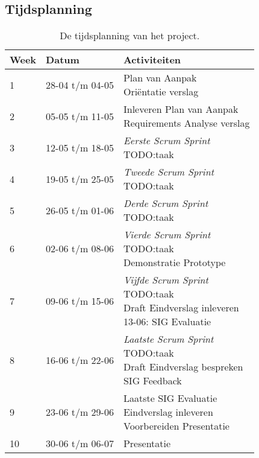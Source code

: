 \begin{appendices}
	\section{Tijdsplanning} \label{app:A}
	\begin{table}[!h]
	\def\arraystretch{1.5}
	\begin{tabularx}{\textwidth}{| p{1cm} | p{3cm}| X |}
	\hline
	\textbf{Week} & \textbf{Datum} & \textbf{Activiteiten} \\ \hline
	1 & 28-04 t/m 04-05 & \specialcell{Plan van Aanpak\\Ori\"entatie verslag}\\ \hline
	2 & 05-05 t/m 11-05 & \specialcell{Inleveren Plan van Aanpak\\Requirements Analyse verslag}\\ \hline
	3 & 12-05 t/m 18-05 & \specialcell{\textit{Eerste Scrum Sprint}\\TODO:taak}\\ \hline
	4 & 19-05 t/m 25-05 & \specialcell{\textit{Tweede Scrum Sprint}\\TODO:taak}\\ \hline
	5 & 26-05 t/m 01-06 & \specialcell{\textit{Derde Scrum Sprint}\\TODO:taak}\\ \hline
	6 & 02-06 t/m 08-06 & \specialcell{\textit{Vierde Scrum Sprint}\\TODO:taak\\Demonstratie Prototype}\\ \hline
	7 & 09-06 t/m 15-06 & \specialcell{\textit{Vijfde Scrum Sprint}\\TODO:taak\\Draft Eindverslag inleveren\\13-06: SIG Evaluatie}\\ \hline
	8 & 16-06 t/m 22-06 & \specialcell{\textit{Laatste Scrum Sprint}\\TODO:taak\\Draft Eindverslag bespreken\\SIG Feedback}\\ \hline
	9 & 23-06 t/m 29-06 & \specialcell{Laatste SIG Evaluatie\\Eindverslag inleveren\\Voorbereiden Presentatie}\\ \hline
	10 & 30-06 t/m 06-07 & Presentatie\\ \hline
	\end{tabularx}
	\caption{De tijdsplanning van het project.}
	\end{table}

\end{appendices}